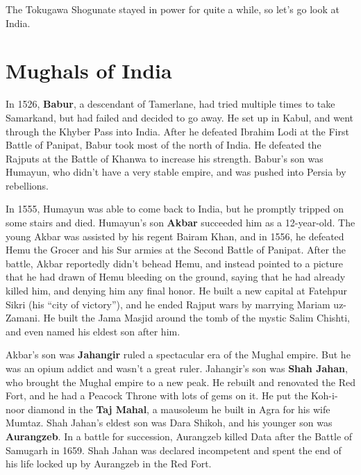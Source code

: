 The Tokugawa Shogunate stayed in power for quite a while, so let's go look at India.

\section{Mughals of India}

In 1526, \textbf{Babur}, a descendant of Tamerlane,
had tried multiple times to take Samarkand, but had failed and decided to go away.
He set up in Kabul, and went through the Khyber Pass into India.
After he defeated Ibrahim Lodi at the First Battle of Panipat, Babur took most of the north of India.
He defeated the Rajputs at the Battle of Khanwa to increase his strength.
Babur's son was Humayun, who didn't have a very stable empire, and was pushed into Persia by rebellions.

In 1555, Humayun was able to come back to India, but he promptly tripped on some stairs and died.
Humayun's son \textbf{Akbar} succeeded him as a 12-year-old.
The young Akbar was assisted by his regent Bairam Khan,
and in 1556, he defeated Hemu the Grocer and his Sur armies at the Second Battle of Panipat.
After the battle, Akbar reportedly didn't behead Hemu,
and instead pointed to a picture that he had drawn of Hemu bleeding on the ground,
saying that he had already killed him, and denying him any final honor.
He built a new capital at Fatehpur Sikri (his ``city of victory''),
and he ended Rajput wars by marrying Mariam uz-Zamani.
He built the Jama Masjid around the tomb of the mystic Salim Chishti,
and even named his eldest son after him.

Akbar's son was \textbf{Jahangir} ruled a spectacular era of the Mughal empire.
But he was an opium addict and wasn't a great ruler.
Jahangir's son was \textbf{Shah Jahan}, who brought the Mughal empire to a new peak.
He rebuilt and renovated the Red Fort, and he had a Peacock Throne with lots of gems on it.
He put the Koh-i-noor diamond in the \textbf{Taj Mahal}, a mausoleum he built in Agra for his wife Mumtaz.
Shah Jahan's eldest son was Dara Shikoh, and his younger son was \textbf{Aurangzeb}.
In a battle for succession, Aurangzeb killed Data after the Battle of Samugarh in 1659.
Shah Jahan was declared incompetent and spent the end of his life locked up by Aurangzeb in the Red Fort.
